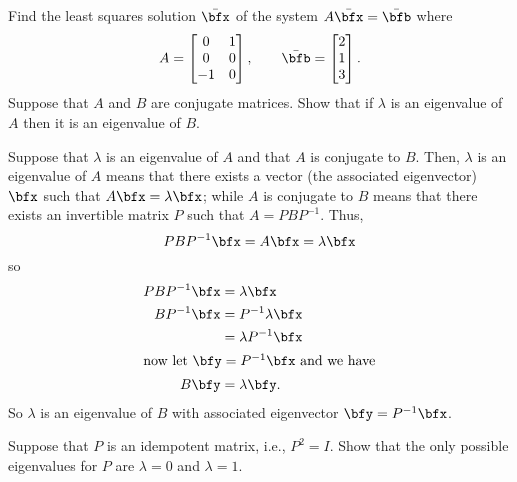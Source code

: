 \begin{questions}
  \question[6] Find the least squares solution $\bar\bfx$ of the system
  $A\bar{\bfx}=\bar{\bfb}$ where
  \[
    A=
    \begin{bmatrix}
      0&1\\
      0&0\\
      -1&0
    \end{bmatrix},
    \qquad
    \bar{\bfb}=
    \begin{bmatrix}
      2\\1\\3
    \end{bmatrix}.
  \]
  \question[4] Suppose that $A$ and $B$ are conjugate matrices. Show that
  if $\lambda$ is an eigenvalue of $A$ then it is an eigenvalue of $B$.
  \begin{solution}
    Suppose that $\lambda$ is an eigenvalue of $A$ and that $A$ is
    conjugate to $B$. Then, $\lambda$ is an eigenvalue of $A$ means that
    there exists a vector (the associated eigenvector) $\bfx$ such that
    $A\bfx=\lambda\bfx$; while $A$ is conjugate to $B$ means that there
    exists an invertible matrix $P$ such that $A=PBP^{-1}$. Thus,
    \[
      PBP^{-1}\bfx=A\bfx=\lambda\bfx
    \]
    so
    \begin{align*}
      PBP^{-1}\bfx
      &=\lambda\bfx\\
      BP^{-1}\bfx&=P^{-1}\lambda\bfx\\
      &=\lambda P^{-1}\bfx\\
      \intertext{now let $\bfy=P^{-1}\bfx$ and we have}
      B\bfy&=\lambda\bfy.
    \end{align*}
    So $\lambda$ is an eigenvalue of $B$ with associated eigenvector
    $\bfy=P^{-1}\bfx$.
  \end{solution}
  \question[8] Suppose that $P$ is an idempotent matrix, i.e., $P^2=I$. Show
  that the only possible eigenvalues for $P$ are $\lambda=0$ and $\lambda=1$.
\end{questions}
